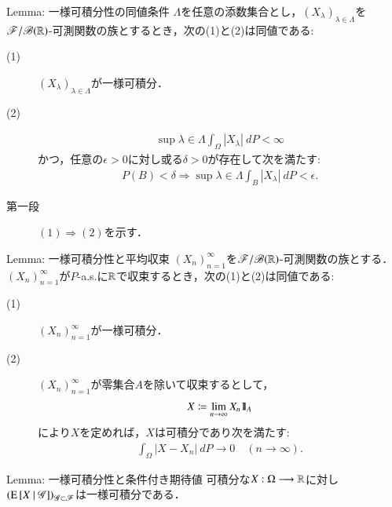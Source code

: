	\begin{itembox}[l]{Lemma: 一様可積分性の同値条件}
		$\Lambda$を任意の添数集合とし，$(X_\lambda)_{\lambda \in \Lambda}$を
		$\mathscr{F}/\mathscr{B}(\mathbb{R})$-可測関数の族とするとき，次の(1)と(2)は同値である:
		\begin{description}
			\item[(1)] $(X_\lambda)_{\lambda \in \Lambda}$が一様可積分．
			\item[(2)] 
				\begin{align}
					\sup{\lambda \in \Lambda}\int_\Omega |X_\lambda|\ dP < \infty
				\end{align}
				かつ，任意の$\epsilon > 0$に対し或る$\delta > 0$が存在して次を満たす:
				\begin{align}
					P(B) < \delta
					\Rightarrow \sup{\lambda \in \Lambda}\int_B |X_\lambda|\ dP < \epsilon.
				\end{align}
		\end{description}
	\end{itembox}
	
	\begin{prf}\mbox{}
		\begin{description}
			\item[第一段]
				$(1) \Rightarrow (2)$を示す．
		\end{description}
	\end{prf}
	
	\begin{itembox}[l]{Lemma: 一様可積分性と平均収束}
		$(X_n)_{n=1}^\infty$を$\mathscr{F}/\mathscr{B}(\mathbb{R})$-可測関数の族とする．
		$(X_n)_{n=1}^\infty$が$P$-a.s.に$\mathbb{R}$で収束するとき，次の(1)と(2)は同値である:
		\begin{description}
			\item[(1)] $(X_n)_{n=1}^\infty$が一様可積分．
			\item[(2)] $(X_n)_{n=1}^\infty$が零集合$A$を除いて収束するとして，
				\begin{align}
					X \coloneqq \lim_{n \to \infty} X_n \mbox{1}\hspace{-0.25em}\mbox{l}_A
				\end{align}
				により$X$を定めれば，$X$は可積分であり次を満たす:
				\begin{align}
					\int_\Omega |X - X_n|\ dP 
					\longrightarrow 0
					\quad (n \longrightarrow \infty).
				\end{align}
		\end{description}
	\end{itembox}
	
	\begin{itembox}[l]{Lemma: 一様可積分性と条件付き期待値}
		可積分な$X:\Omega \longrightarrow \mathbb{R}$に対し
		$\left( \operatorname{E} \left[ X \ \middle|\ \mathscr{G} \right] \right)_{\mathscr{G} \subset \mathscr{F}}$は一様可積分である．
	\end{itembox}
	

